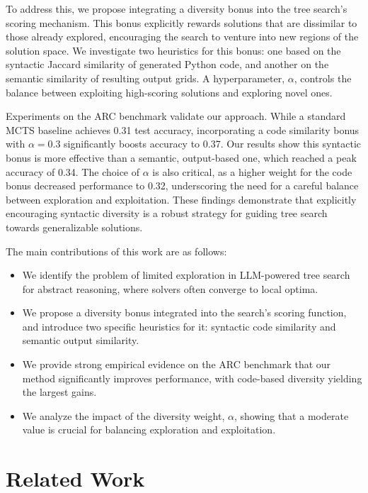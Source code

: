 \documentclass{article} %
\begin{document}
To address this, we propose integrating a diversity bonus into the tree search's scoring mechanism. This bonus explicitly rewards solutions that are dissimilar to those already explored, encouraging the search to venture into new regions of the solution space. We investigate two heuristics for this bonus: one based on the syntactic Jaccard similarity of generated Python code, and another on the semantic similarity of resulting output grids. A hyperparameter, $\alpha$, controls the balance between exploiting high-scoring solutions and exploring novel ones.

Experiments on the ARC benchmark validate our approach. While a standard MCTS baseline achieves 0.31 test accuracy, incorporating a code similarity bonus with $\alpha=0.3$ significantly boosts accuracy to 0.37. Our results show this syntactic bonus is more effective than a semantic, output-based one, which reached a peak accuracy of 0.34. The choice of $\alpha$ is also critical, as a higher weight for the code bonus decreased performance to 0.32, underscoring the need for a careful balance between exploration and exploitation. These findings demonstrate that explicitly encouraging syntactic diversity is a robust strategy for guiding tree search towards generalizable solutions.

The main contributions of this work are as follows:
\begin{itemize}
    \item We identify the problem of limited exploration in LLM-powered tree search for abstract reasoning, where solvers often converge to local optima.
    \item We propose a diversity bonus integrated into the search's scoring function, and introduce two specific heuristics for it: syntactic code similarity and semantic output similarity.
    \item We provide strong empirical evidence on the ARC benchmark that our method significantly improves performance, with code-based diversity yielding the largest gains.
    \item We analyze the impact of the diversity weight, $\alpha$, showing that a moderate value is crucial for balancing exploration and exploitation.
\end{itemize}

\section{Related Work}
\label{sec:related}
\end{document}
